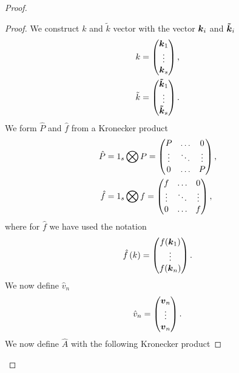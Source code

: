 \begin{proof}
\begin{proof}
We construct $k$ and $\tilde{k}$ vector with the vector ${\boldsymbol {k}}_{i}$ and ${\boldsymbol {\tilde{k}}}_{i}$
\begin{align}
k&=\begin{pmatrix}
    {\boldsymbol {k}}_{1}\\
    \vdots\\
    {\boldsymbol {k}}_{s}\\
  \end{pmatrix},\\
\tilde{k}&=\begin{pmatrix}
    {\boldsymbol {\tilde{k}}}_{1}\\
    \vdots\\
    {\boldsymbol {\tilde{k}}}_{s}\\
  \end{pmatrix}.
\end{align}
We form $\hat{P}$ and $\hat{f}$ from a Kronecker product
\begin{align}
\hat{P}&=1_{s}\bigotimes P=\begin{pmatrix}P	&\ldots	&0\\
			\vdots &\ddots 	&\vdots\\
			0	&\ldots		&P\\
	\end{pmatrix},\\
\hat{f}&=1_{s}\bigotimes f=\begin{pmatrix}f	&\ldots	&0\\
			\vdots &\ddots 	&\vdots\\
			0	&\ldots	&f\\
	\end{pmatrix},
\end{align}
where for $\hat{f}$ we have used the notation
\begin{equation}
 \hat{f}\left(k\right)=\begin{pmatrix}f({\boldsymbol {k}}_1)\\
			\vdots\\
			f({\boldsymbol {k}}_n)\\
	\end{pmatrix}.
\end{equation}
We now define $\hat{v}_n$
\begin{equation}
\hat{v}_{n}=\begin{pmatrix}
	      {\boldsymbol {v}}_{n}\\
	      \vdots\\
	      {\boldsymbol {v}}_{n}
	      \end{pmatrix}.
\end{equation}
We now define $\hat{A}$ with the following Kronecker product

\end{proof}
\end{proof}
